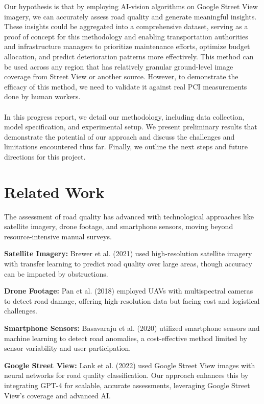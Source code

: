 \documentclass{article}
\begin{document}
Our hypothesis is that by employing AI-vision algorithms on Google Street View imagery, we can accurately assess road quality and generate meaningful insights. These insights could be aggregated into a comprehensive dataset, serving as a proof of concept for this methodology and enabling transportation authorities and infrastructure managers to prioritize maintenance efforts, optimize budget allocation, and predict deterioration patterns more effectively. This method can be used across any region that has relatively granular ground-level image coverage from Street View or another source. However, to demonstrate the efficacy of this method, we need to validate it against real PCI measurements done by human workers.
\\\\In this progress report, we detail our methodology, including data collection, model specification, and experimental setup. We present preliminary results that demonstrate the potential of our approach and discuss the challenges and limitations encountered thus far. Finally, we outline the next steps and future directions for this project.

\section{Related Work}




The assessment of road quality has advanced with technological approaches like satellite imagery, drone footage, and smartphone sensors, moving beyond resource-intensive manual surveys.

\textbf{Satellite Imagery:} Brewer et al. (2021) used high-resolution satellite imagery with transfer learning to predict road quality over large areas, though accuracy can be impacted by obstructions.

\textbf{Drone Footage:} Pan et al. (2018) employed UAVs with multispectral cameras to detect road damage, offering high-resolution data but facing cost and logistical challenges.

\textbf{Smartphone Sensors:} Basavaraju et al. (2020) utilized smartphone sensors and machine learning to detect road anomalies, a cost-effective method limited by sensor variability and user participation.

\textbf{Google Street View:} Lank et al. (2022) used Google Street View images with neural networks for road quality classification. Our approach enhances this by integrating GPT-4 for scalable, accurate assessments, leveraging Google Street View's coverage and advanced AI.
\end{document}
